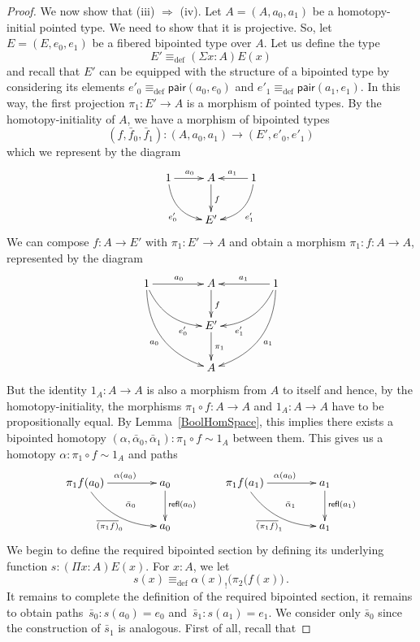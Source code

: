 \documentclass[reqno,10pt,a4paper,oneside]{amsart}
\numberwithin{equation}{section}
\theoremstyle{mythm}
\theoremstyle{mydef}
\theoremstyle{myrmk}
\newcommand{\deq}{\equiv}
\newcommand{\peq}{=}
\newcommand{\defeq}{\deq_{\mathrm{def}}}
\newcommand{\co}{\colon}
\newcommand{\pair}{\mathsf{pair}}
\newcommand{\refl}{\mathsf{refl}}
\begin{document}
\begin{proof}
We now  show that (iii) $\Rightarrow$ (iv).
Let $A = (A, a_0, a_1)$ be a homotopy-initial pointed type. We need to show that it is projective. So, let $E = (E, e_0, e_1)$ be a fibered 
bipointed type over $A$. Let us define the type 
\[
E' \defeq (\Sigma x \co A) E(x) 
\]
and recall that $E'$ can be equipped with the structure of a bipointed type by considering its elements $e'_0 \defeq \pair(a_0, e_0)$ and $e'_1 \defeq \pair(a_1, e_1)$. In this way,  the first projection $\pi_1 \co E' \to A$ is a morphism of pointed types. By the homotopy-initiality of $A$, we have a morphism of bipointed types
\[
(f, \bar{f}_0, \bar{f}_1) \co (A, a_0, a_1)  \to (E', e'_0, e'_1) 
\]
which we represent by the diagram
\[
\xymatrix{
1 \ar@/_1pc/[dr]_{e'_0} \ar[r]^{a_0} & A  \ar[d]^f & 1 \ar[l]_{a_1} \ar@/^1pc/[dl]^{e'_1} \\
 & E' & }
 \]
 We can compose $f \co A \to E'$ with $\pi_1 \co E' \to A$ and obtain a morphism $\pi_1 \co f \co A \to A$, represented by the diagram
  \[
\xymatrix@C=1.5cm{
1 \ar@/_1pc/[dr]_(.7){e'_0} \ar[r]^{a_0} \ar@/_1.5pc/[ddr]_{a_0}  & A  \ar[d]^f & 1 \ar[l]_{a_1} \ar@/^1pc/[dl]^(.7){e'_1} \ar@/^1.5pc/[ddl]^{a_1}  \\
 & E' \ar[d]^{\pi_1} & \\
 & A &  }
 \]
But the identity $1_A \co A \to A$ is also a morphism from $A$ to itself and hence, by the homotopy-initiality, the morphisms $\pi_1 \circ f \co A \to A$
and $1_A \co A \to A$ have to be propositionally equal. By Lemma~\ref{BoolHomSpace}, this implies there exists a bipointed homotopy $(\alpha,
\bar{\alpha}_0,\bar{\alpha}_1) \co \pi_1 \circ f \sim 1_A$ between them. This gives us a homotopy $\alpha \co \pi_1 \circ f \sim 1_A$ and paths
\[
\xymatrix@C=1.5cm{
\pi_1 f (a_0) \ar[r]^{\alpha(a_0)} \ar@/_1pc/[dr]_{\overline{(\pi_1 f)}_0} \ar@{}[dr]|{\quad \bar{\alpha}_0}  & a_0 \ar[d]^{\refl(a_0)} \\
 & a_0 } \qquad
 \xymatrix@C=1.5cm{
\pi_1 f (a_1) \ar[r]^{\alpha(a_0)} \ar@/_1pc/[dr]_{\overline{(\pi_1 f)}_1} \ar@{}[dr]|{\quad \bar{\alpha}_1}  & a_1 \ar[d]^{\refl(a_1)} \\
 & a_1 }
\]
We begin to define the required bipointed section by defining its underlying function $s \co (\Pi x \co A) E(x)$. For $x \co A$, we let
\begin{equation}
\label{equ:defreqsection}
s(x) \defeq \alpha(x)_{!} \big( \pi_2(f(x) \big) \, .
\end{equation}
It remains to complete the definition of the required bipointed section, it remains to obtain paths~$\bar{s}_0 \co s(a_0)  \peq e_0$ and~$\bar{s}_1 \co s(a_1) \peq e_1$. We consider only $\bar{s}_0$ since the construction of $\bar{s}_1$ is  analogous. First of all, recall that 

\end{proof}
\end{document}
